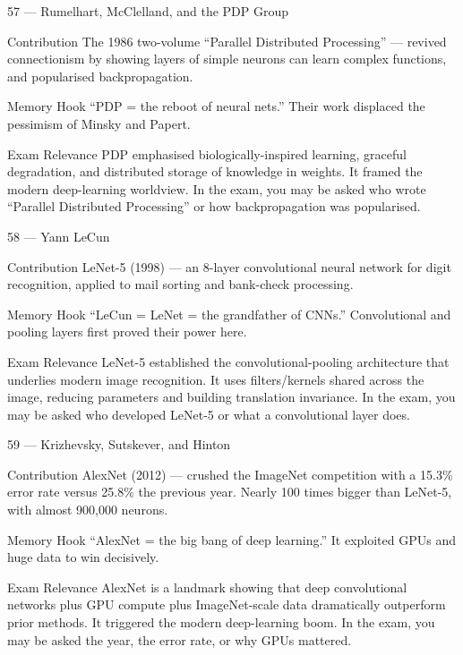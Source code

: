 \documentclass[aspectratio=169,8pt]{beamer}
\begin{document}
	\begin{frame}{57 --- Rumelhart, McClelland, and the PDP Group}
		\begin{block}{Contribution}
			The 1986 two-volume ``Parallel Distributed Processing'' --- revived connectionism by showing layers of simple neurons can learn complex functions, and popularised backpropagation.
		\end{block}
		\begin{block}{Memory Hook}
			``PDP = the reboot of neural nets.'' Their work displaced the pessimism of Minsky and Papert.
		\end{block}
		\begin{block}{Exam Relevance}
			PDP emphasised biologically-inspired learning, graceful degradation, and distributed storage of knowledge in weights. It framed the modern deep-learning worldview. In the exam, you may be asked who wrote ``Parallel Distributed Processing'' or how backpropagation was popularised.
		\end{block}
	\end{frame}
	
	\begin{frame}{58 --- Yann LeCun}
		\begin{block}{Contribution}
			LeNet-5 (1998) --- an 8-layer convolutional neural network for digit recognition, applied to mail sorting and bank-check processing.
		\end{block}
		\begin{block}{Memory Hook}
			``LeCun = LeNet = the grandfather of CNNs.'' Convolutional and pooling layers first proved their power here.
		\end{block}
		\begin{block}{Exam Relevance}
			LeNet-5 established the convolutional-pooling architecture that underlies modern image recognition. It uses filters/kernels shared across the image, reducing parameters and building translation invariance. In the exam, you may be asked who developed LeNet-5 or what a convolutional layer does.
		\end{block}
	\end{frame}
	
	\begin{frame}{59 --- Krizhevsky, Sutskever, and Hinton}
		\begin{block}{Contribution}
			AlexNet (2012) --- crushed the ImageNet competition with a 15.3\% error rate versus 25.8\% the previous year. Nearly 100 times bigger than LeNet-5, with almost 900,000 neurons.
		\end{block}
		\begin{block}{Memory Hook}
			``AlexNet = the big bang of deep learning.'' It exploited GPUs and huge data to win decisively.
		\end{block}
		\begin{block}{Exam Relevance}
			AlexNet is a landmark showing that deep convolutional networks plus GPU compute plus ImageNet-scale data dramatically outperform prior methods. It triggered the modern deep-learning boom. In the exam, you may be asked the year, the error rate, or why GPUs mattered.
		\end{block}
	\end{frame}
	
\end{document}
